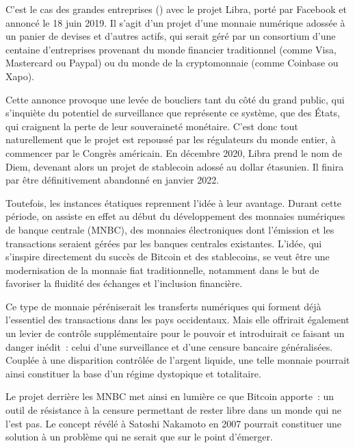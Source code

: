 C'est le cas des grandes entreprises () avec le projet Libra, porté par Facebook et annoncé le 18 juin 2019. Il s'agit d'un projet d'une monnaie numérique adossée à un panier de devises et d'autres actifs, qui serait géré par un consortium d'une centaine d'entreprises provenant du monde financier traditionnel (comme Visa, Mastercard ou Paypal) ou du monde de la cryptomonnaie (comme Coinbase ou Xapo).

Cette annonce provoque une levée de boucliers tant du côté du grand public, qui s'inquiète du potentiel de surveillance que représente ce système, que des États, qui craignent la perte de leur souveraineté monétaire. C'est donc tout naturellement que le projet est repoussé par les régulateurs du monde entier, à commencer par le Congrès américain. En décembre 2020, Libra prend le nom de Diem, devenant alors un projet de stablecoin adossé au dollar étasunien. Il finira par être définitivement abandonné en janvier 2022.

Toutefois, les instances étatiques reprennent l'idée à leur avantage. Durant cette période, on assiste en effet au début du développement des monnaies numériques de banque centrale (MNBC), des monnaies électroniques dont l'émission et les transactions seraient gérées par les banques centrales existantes. L'idée, qui s'inspire directement du succès de Bitcoin et des stablecoins, se veut être une modernisation de la monnaie fiat traditionnelle, notamment dans le but de favoriser la fluidité des échanges et l'inclusion financière.

Ce type de monnaie péréniserait les transferts numériques qui forment déjà l'essentiel des transactions dans les pays occidentaux. Mais elle offrirait également un levier de contrôle supplémentaire pour le pouvoir et introduirait ce faisant un danger inédit~: celui d'une surveillance et d'une censure bancaire généralisées. Couplée à une disparition contrôlée de l'argent liquide, une telle monnaie pourrait ainsi constituer la base d'un régime dystopique et totalitaire.

Le projet derrière les MNBC met ainsi en lumière ce que Bitcoin apporte~: un outil de résistance à la censure permettant de rester libre dans un monde qui ne l'est pas. Le concept révélé à Satoshi Nakamoto en 2007 pourrait constituer une solution à un problème qui ne serait que sur le point d'émerger.

